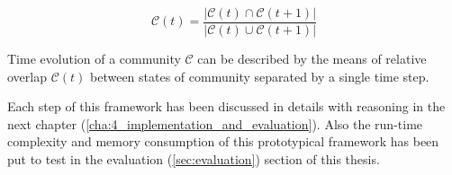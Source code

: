 \begin{equation}
\mathcal{C}(t) = \dfrac{\lvert \mathcal{C}(t) \cap \mathcal{C}(t+1) \rvert}{\lvert \mathcal{C}(t) \cup \mathcal{C}(t+1) \rvert}
\end{equation}

Time evolution of a community $\mathcal{C}$ can be described by the means of relative overlap $\mathcal{C}(t)$ between states of community separated by a single time step.

Each step of this framework has been discussed in details with reasoning in the next chapter (\ref{cha:4_implementation_and_evaluation}). Also the run-time complexity and memory consumption of this prototypical framework has been put to test in the evaluation (\ref{sec:evaluation}) section of this thesis.
